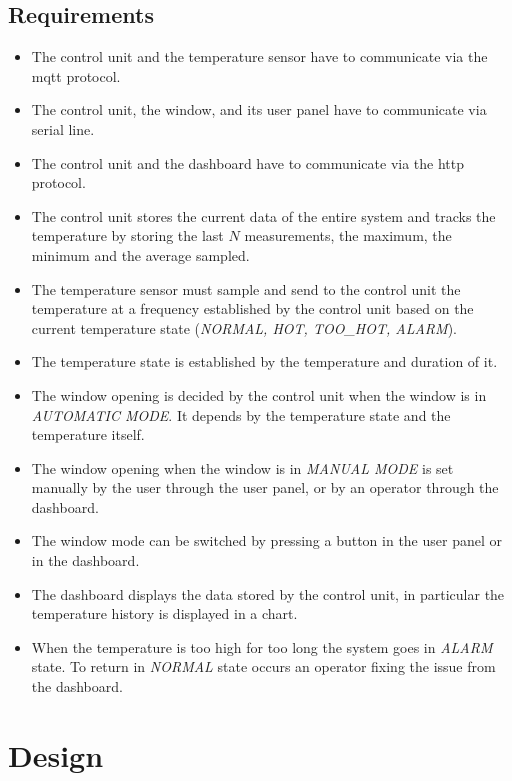 \documentclass[a4paper,12pt]{report}
\begin{document}
    \section{Requirements}

        \begin{itemize}
            \item The control unit and the temperature sensor have to communicate via the mqtt protocol.
            \item The control unit, the window, and its user panel have to communicate via serial line.
            \item The control unit and the dashboard have to communicate via the http protocol.
            \item The control unit stores the current data of the entire system and tracks the temperature by storing the last
            $N$ measurements, the maximum, the minimum and the average sampled.
            \item The temperature sensor must sample and send to the control unit the temperature at a frequency established by
            the control unit based on the current temperature state (\textit{NORMAL, HOT, TOO\_HOT, ALARM}).
            \item The temperature state is established by the temperature and duration of it.
            \item The window opening is decided by the control unit when the window is in \textit{AUTOMATIC MODE}. It depends by
            the temperature state and the temperature itself.
            \item The window opening when the window is in \textit{MANUAL MODE} is set manually by the user through the user panel,
            or by an operator through the dashboard.
            \item The window mode can be switched by pressing a button in the user panel or in the dashboard.
            \item The dashboard displays the data stored by the control unit, in particular the temperature history is displayed
            in a chart.
            \item When the temperature is too high for too long the system goes in \textit{ALARM} state. To return in
            \textit{NORMAL} state occurs an operator fixing the issue from the dashboard.
        \end{itemize}


\chapter{Design}
\end{document}
